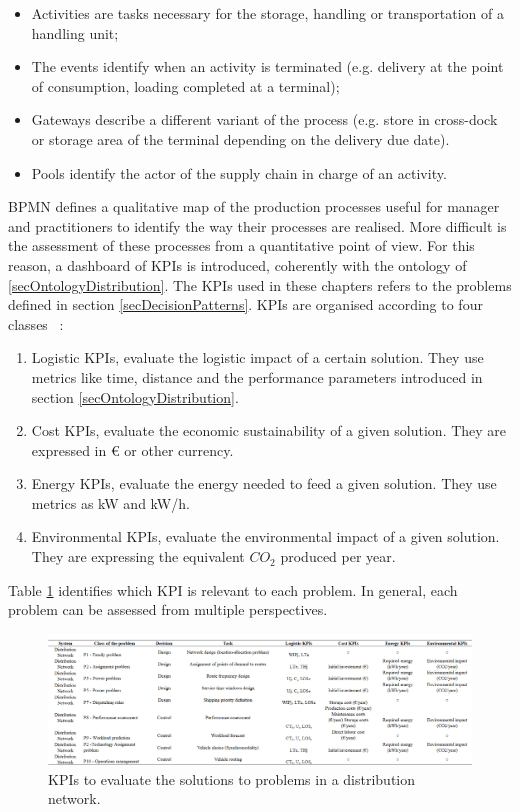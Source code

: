 \begin{itemize}
    \item Activities are tasks necessary for the storage, handling or transportation of a handling unit;
    \item The events identify when an activity is terminated (e.g. delivery at the point of consumption, loading completed at a terminal);
    \item Gateways describe a different variant of the process (e.g. store in cross-dock or storage area of the terminal depending on the delivery due date).
    \item Pools identify the actor of the supply chain in charge of an activity.

\end{itemize}

BPMN defines a qualitative map of the production processes useful for manager and practitioners to identify the way their processes are realised. More difficult is the assessment of these processes from a quantitative point of view. For this reason, a dashboard of KPIs is introduced, coherently with the ontology of \ref{secOntologyDistribution}. The KPIs used in these chapters refers to the problems defined in section \ref{secDecisionPatterns}. KPIs are organised according to four classes ~\cite{Tufano2018}:

\begin{enumerate}
    \item Logistic KPIs, evaluate the logistic impact of a certain solution. They use metrics like time, distance and the performance parameters introduced in section \ref{secOntologyDistribution}.
	\item Cost KPIs, evaluate the economic sustainability of a given solution. They are expressed in \euro{} or other currency.
	\item Energy KPIs, evaluate the energy needed to feed a given solution. They use metrics as kW and kW/h.
	\item Environmental KPIs, evaluate the environmental impact of a given solution. They are expressing the equivalent $CO_2$ produced per year.

\end{enumerate}
Table \ref{tab_KPIs} identifies which KPI is relevant to each problem. In general, each problem can be assessed from multiple perspectives.

\begin{figure}[hbt!]
\centering
\includegraphics[width=1.0\textwidth]{SectionDistribution/control_figures/tab_KPIs.png}
\captionsetup{type=table}
\caption{KPIs to evaluate the solutions to problems in a distribution network.}
\label{tab_KPIs}
\end{figure}

